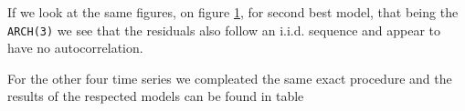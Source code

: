 \documentclass{article}
\begin{document}
If we look at the same figures, on figure \ref{fig:aparch_rd2}, for second best model, that being the \verb|ARCH(3)| we see that the residuals also follow an i.i.d. sequence and appear to have no autocorrelation.

\begin{figure}[ht!]
   \centering

    \label{fig:aparch_rd2}
\end{figure}

For the other four time series we compleated the same exact procedure and the results of the respected models can be found in table 
\end{document}
